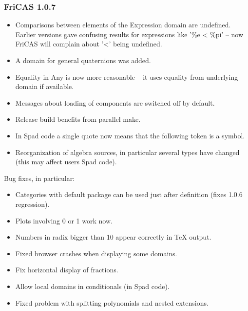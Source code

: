 \subsubsection{FriCAS 1.0.7}

\begin{itemize}
\item Comparisons between elements of the Expression domain are
  undefined. Earlier versions gave confusing results for expressions
  like '\%e < \%pi' -- now FriCAS will complain about '<' being
  undefined.

\item A domain for general quaternions was added.

\item Equality in Any is now more reasonable -- it uses equality from
  underlying domain if available.

\item Messages about loading of components are switched off by
  default.

\item Release build benefits from parallel make.

\item In Spad code a single quote now means that the following token
  is a symbol.

\item Reorganization of algebra sources, in particular several types
  have changed (this may affect users Spad code).
\end{itemize}

Bug fixes, in particular:

\begin{itemize}
\item Categories with default package can be used just after
  definition (fixes 1.0.6 regression).

\item Plots involving 0 or 1 work now.

\item Numbers in radix bigger than 10 appear correctly in TeX output.

\item Fixed browser crashes when displaying some domains.

\item Fix horizontal display of fractions.

\item Allow local domains in conditionals (in Spad code).

\item Fixed problem with splitting polynomials and nested extensions.
\end{itemize}


